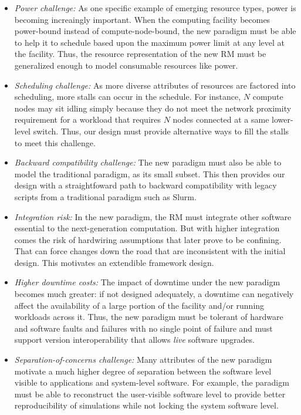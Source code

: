 \documentclass{article}
\newcommand{\slurm}{Slurm}
\begin{document}
\begin{itemize}
\item{\sl Power challenge:} As one specific example of emerging resource types,
      power is becoming increaingly important. When the computing
      facility becomes power-bound instead of compute-node-bound, the new
      paradigm must be able to help it to schedule based upon the 
      maximum power limit at any level at the facility. Thus, 
      the resource representation of the new RM must be generalized
      enough to model consumable resources like power.  
      
\item{\sl Scheduling challenge:} As more diverse attributes of resources
      are factored into scheduling, more stalls can occur in the schedule.
      For instance, $N$ compute nodes may sit idling simply because they do not meet
      the network proximity requirement for a workload that requires 
      $N$ nodes connected at a same lower-level switch. Thus, our design 
      must provide alternative ways to fill the stalls to meet this 
      challenge.

\item{\sl Backward compatibility challenge:} The new paradigm must also be
      able to model the traditional paradigm, as its small subset. This
      then provides our design with a straightfoward path to 
      backward compatibility with legacy scripts from a traditional 
      paradigm such as \slurm.

\item{\sl Integration risk:} In the new paradigm, the RM must 
     integrate other software essential to the next-generation computation. 
     But with higher integration comes the risk of hardwiring assumptions
     that later prove to be confining. That can force changes down the road
     that are inconsistent with the initial design. This motivates
     an extendible framework design. 
     
\item{\sl Higher downtime costs:} The impact of downtime under the 
     new paradigm becomes much greater: if not designed adequately, 
     a downtime can negatively affect the availability of
     a large portion of the facility and/or running workloads across it.
     Thus, the new paradigm must be tolerant of hardware and software faults 
     and failures with no single point of failure and must support version 
     interoperability that allows {\em live} software upgrades.

\item{\sl Separation-of-concerns challenge:} Many attributes of the new
     paradigm motivate a much higher degree of separation between
     the software level visible to applications and system-level 
     software. For example, the paradigm must be able to reconstruct the user-visible
     software level to provide better reproducibility of simulations while not
     locking the system software level. 
   

\end{itemize}
\end{document}
